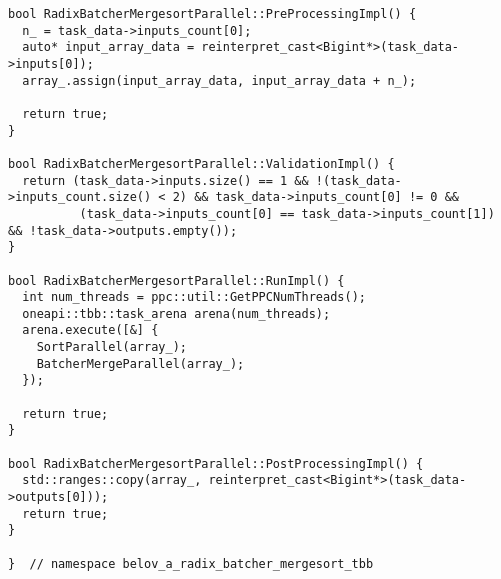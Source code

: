\documentclass[a4paper,12pt]{article}
\begin{document}
\begin{lstlisting}
bool RadixBatcherMergesortParallel::PreProcessingImpl() {
  n_ = task_data->inputs_count[0];
  auto* input_array_data = reinterpret_cast<Bigint*>(task_data->inputs[0]);
  array_.assign(input_array_data, input_array_data + n_);

  return true;
}

bool RadixBatcherMergesortParallel::ValidationImpl() {
  return (task_data->inputs.size() == 1 && !(task_data->inputs_count.size() < 2) && task_data->inputs_count[0] != 0 &&
          (task_data->inputs_count[0] == task_data->inputs_count[1]) && !task_data->outputs.empty());
}

bool RadixBatcherMergesortParallel::RunImpl() {
  int num_threads = ppc::util::GetPPCNumThreads();
  oneapi::tbb::task_arena arena(num_threads);
  arena.execute([&] {
    SortParallel(array_);
    BatcherMergeParallel(array_);
  });

  return true;
}

bool RadixBatcherMergesortParallel::PostProcessingImpl() {
  std::ranges::copy(array_, reinterpret_cast<Bigint*>(task_data->outputs[0]));
  return true;
}

}  // namespace belov_a_radix_batcher_mergesort_tbb
\end{lstlisting}
\end{document}
